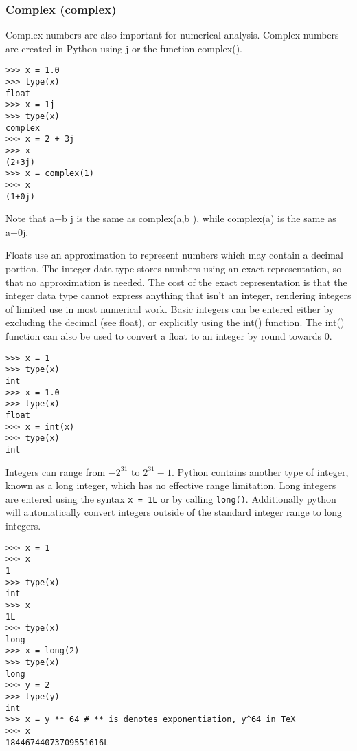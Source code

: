 \documentclass[KSmain.tex]{subfiles}
\begin{document}
\subsubsection{Complex (complex)}

Complex numbers are also important for numerical analysis. Complex numbers are created in Python
using j or the function complex().
\begin{framed}
\begin{verbatim}
>>> x = 1.0
>>> type(x)
float
>>> x = 1j
>>> type(x)
complex
>>> x = 2 + 3j
>>> x
(2+3j)
>>> x = complex(1)
>>> x
(1+0j)
\end{verbatim}
\end{framed}
Note that a+b j is the same as complex(a,b ), while complex(a) is the same as a+0j.
\newpage

Floats use an approximation to represent numbers which may contain a decimal portion. The integer data
type stores numbers using an exact representation, so that no approximation is needed. The cost of the
exact representation is that the integer data type cannot express anything that isn’t an integer, rendering
integers of limited use in most numerical work.
Basic integers can be entered either by excluding the decimal (see float), or explicitly using the int()
function. The int() function can also be used to convert a float to an integer by round towards 0.
\begin{framed}
\begin{verbatim}
>>> x = 1
>>> type(x)
int
>>> x = 1.0
>>> type(x)
float
>>> x = int(x)
>>> type(x)
int
\end{verbatim}
\end{framed}
Integers can range from $-2^31$ to $2^31-1$. 
Python contains another type of integer, known as a long
integer, which has no effective range limitation. Long integers are entered using the syntax \texttt{x = 1L} or by
calling \texttt{long()}. Additionally python will automatically convert integers outside of the standard integer
range to long integers.
\begin{framed}
\begin{verbatim}
>>> x = 1
>>> x
1
>>> type(x)
int
>>> x
1L
>>> type(x)
long
>>> x = long(2)
>>> type(x)
long
>>> y = 2
>>> type(y)
int
>>> x = y ** 64 # ** is denotes exponentiation, y^64 in TeX
>>> x
18446744073709551616L
\end{verbatim}
\end{framed}
\end{document}
